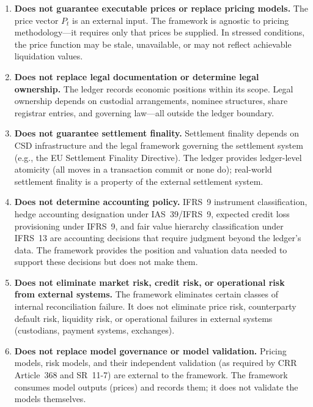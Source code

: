 \documentclass[11pt,a4paper]{article}
\begin{document}
\begin{enumerate}
\item \textbf{Does not guarantee executable prices or replace pricing models.} The price vector $P_t$ is an external input. The framework is agnostic to pricing methodology---it requires only that prices be supplied. In stressed conditions, the price function may be stale, unavailable, or may not reflect achievable liquidation values.

\item \textbf{Does not replace legal documentation or determine legal ownership.} The ledger records economic positions within its scope. Legal ownership depends on custodial arrangements, nominee structures, share registrar entries, and governing law---all outside the ledger boundary.

\item \textbf{Does not guarantee settlement finality.} Settlement finality depends on CSD infrastructure and the legal framework governing the settlement system (e.g., the EU Settlement Finality Directive). The ledger provides ledger-level atomicity (all moves in a transaction commit or none do); real-world settlement finality is a property of the external settlement system.

\item \textbf{Does not determine accounting policy.} IFRS~9 instrument classification, hedge accounting designation under IAS~39/IFRS~9, expected credit loss provisioning under IFRS~9, and fair value hierarchy classification under IFRS~13 are accounting decisions that require judgment beyond the ledger's data. The framework provides the position and valuation data needed to support these decisions but does not make them.

\item \textbf{Does not eliminate market risk, credit risk, or operational risk from external systems.} The framework eliminates certain classes of internal reconciliation failure. It does not eliminate price risk, counterparty default risk, liquidity risk, or operational failures in external systems (custodians, payment systems, exchanges).

\item \textbf{Does not replace model governance or model validation.} Pricing models, risk models, and their independent validation (as required by CRR Article~368 and SR~11-7) are external to the framework. The framework consumes model outputs (prices) and records them; it does not validate the models themselves.


\end{enumerate}
\end{document}
